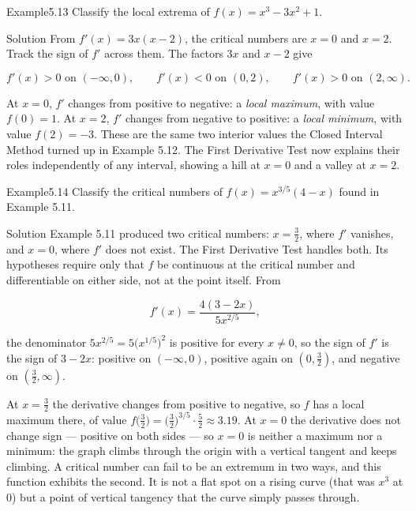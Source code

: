 \documentclass[a4paper,12pt,oneside]{memoir}
\begin{document}
\begin{workedexample}
\begin{envexample}{Example}{5.13}{}
Classify the local extrema of \(f(x) = x^{3} - 3x^{2} + 1\).
\end{envexample}
\begin{envsolution}{Solution}{}{}
From \(f'(x) = 3x(x - 2)\), the critical numbers are \(x = 0\) and \(x = 2\). Track the sign of \(f'\) across them. The factors \(3x\) and \(x - 2\) give

\[ f'(x) > 0 \text{ on } (-\infty, 0), \qquad f'(x) < 0 \text{ on } (0, 2), \qquad f'(x) > 0 \text{ on } (2, \infty). \]

At \(x = 0\), \(f'\) changes from positive to negative: a \emph{local maximum}, with value \(f(0) = 1\). At \(x = 2\), \(f'\) changes from negative to positive: a \emph{local minimum}, with value \(f(2) = -3\). These are the same two interior values the Closed Interval Method turned up in Example 5.12. The First Derivative Test now explains their roles independently of any interval, showing a hill at \(x = 0\) and a valley at \(x = 2\). \qedmark
\end{envsolution}
\end{workedexample}
\begin{workedexample}
\begin{envexample}{Example}{5.14}{}
Classify the critical numbers of \(f(x) = x^{3/5}(4 - x)\) found in Example 5.11.
\end{envexample}
\begin{envsolution}{Solution}{}{}
Example 5.11 produced two critical numbers: \(x = \tfrac{3}{2}\), where \(f'\) vanishes, and \(x = 0\), where \(f'\) does not exist. The First Derivative Test handles both. Its hypotheses require only that \(f\) be continuous at the critical number and differentiable on either side, not at the point itself. From

\[ f'(x) = \frac{4(3 - 2x)}{5x^{2/5}}, \]

the denominator \(5x^{2/5} = 5\bigl(x^{1/5}\bigr)^{2}\) is positive for every \(x \ne 0\), so the sign of \(f'\) is the sign of \(3 - 2x\): positive on \((-\infty, 0)\), positive again on \((0, \tfrac{3}{2})\), and negative on \((\tfrac{3}{2}, \infty)\).

At \(x = \tfrac{3}{2}\) the derivative changes from positive to negative, so \(f\) has a local maximum there, of value \(f\bigl(\tfrac{3}{2}\bigr) = \bigl(\tfrac{3}{2}\bigr)^{3/5} \cdot \tfrac{5}{2} \approx 3.19\). At \(x = 0\) the derivative does not change sign — positive on both sides — so \(x = 0\) is neither a maximum nor a minimum: the graph climbs through the origin with a vertical tangent and keeps climbing. A critical number can fail to be an extremum in two ways, and this function exhibits the second. It is not a flat spot on a rising curve (that was \(x^{3}\) at \(0\)) but a point of vertical tangency that the curve simply passes through. \qedmark
\end{envsolution}
\end{workedexample}
\end{document}
